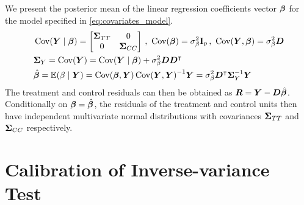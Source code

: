 \begin{appendices}
We present the posterior mean of the linear regression coefficients vector \(\bm{\beta}\) for the model specified in \autoref{eq:covariates_model}.
\begin{equation}
    \begin{split}
        &
        \cov\del{\Yvec \mid \betavec }
                = \begin{bmatrix}
                    \STT & 0 \\
                    0 & \SCC
                  \end{bmatrix}
            \,,\ 
            \cov\del{\betavec} = \sigmabeta^2 \eye_p 
            \,,\  
            \cov\del{\Yvec, \betavec} = \sigmabeta^2 \Dmat \\&
        \SigmaMat_Y = \cov\del{\Yvec} 
            = \cov\del{\Yvec \mid \betavec}
                + \sigmabeta^2 \Dmat \Dmat\trans \\&
        \hat\betavec 
            = \E\del{\beta \mid \Yvec} 
            = \cov\del{\betavec,\Yvec} \cov\del{\Yvec,\Yvec}^{-1} \Yvec
            = \sigmabeta^2 \Dmat\trans\SigmaMat_{Y}^{-1} \Yvec
    \end{split}
\end{equation}
The treatment and control residuals can then be obtained as \(\bm{R} = \bm{Y} - \bm{D} \hat{\bm{\beta}}\).
Conditionally on \(\bm{\beta}=\hat{\bm{\beta}}\), the residuals of the treatment and control units then have independent multivariate normal distributions with covariances \(\bm{\Sigma}_{T T}\) and \(\bm{\Sigma}_{C C}\) respectively.


\section{Calibration of Inverse-variance Test}
\label{sec:calibration}


\end{appendices}
